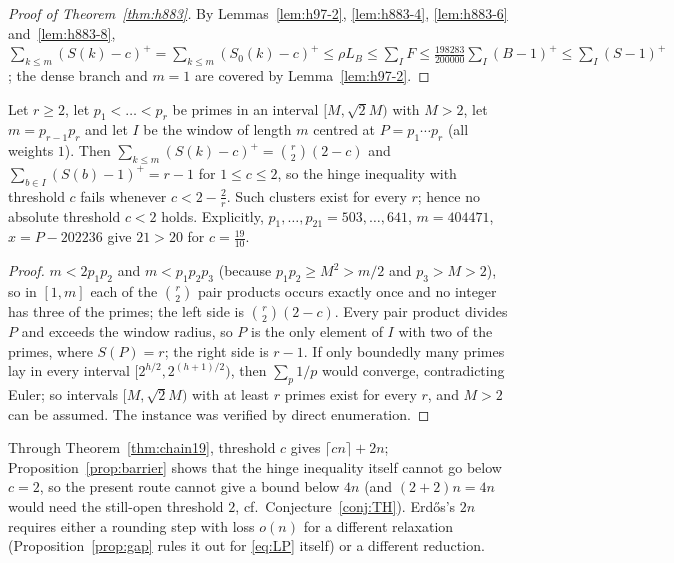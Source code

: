 \begin{proof}[Proof of Theorem~\ref{thm:h883}]
By Lemmas~\ref{lem:h97-2}, \ref{lem:h883-4}, \ref{lem:h883-6} and~\ref{lem:h883-8},
$\sum_{k\le m}(S(k)-c)^+=\sum_{k\le m}(S_0(k)-c)^+\le\rho L_B\le\sum_IF\le\tfrac{198283}{200000}\sum_I(B-1)^+
\le\sum_I(S-1)^+$; the dense branch and $m=1$ are covered by Lemma~\ref{lem:h97-2}.
\end{proof}

\begin{proposition}\label{prop:barrier}
Let $r\ge2$, let $p_1<\dots<p_r$ be primes in an interval $[M,\sqrt2M)$ with $M>2$, let $m=p_{r-1}p_r$ and let $I$ be
the window of length $m$ centred at $P=p_1\cdots p_r$ (all weights $1$). Then
$\sum_{k\le m}(S(k)-c)^+=\binom r2(2-c)$ and $\sum_{b\in I}(S(b)-1)^+=r-1$ for $1\le c\le2$, so the hinge inequality with
threshold $c$ fails whenever $c<2-\tfrac2r$. Such clusters exist for every $r$; hence no absolute threshold $c<2$ holds.
Explicitly, $p_1,\dots,p_{21}=503,\dots,641$, $m=404471$, $x=P-202236$ give $21>20$ for $c=\tfrac{19}{10}$.
\end{proposition}
\begin{proof}
$m<2p_1p_2$ and $m<p_1p_2p_3$ (because $p_1p_2\ge M^2>m/2$ and $p_3>M>2$), so in $[1,m]$ each of the $\binom r2$
pair products occurs exactly once and no integer has three of the primes; the left side is $\binom r2(2-c)$. Every
pair product divides $P$ and exceeds the window radius, so $P$ is the only element of $I$ with two of the primes, where
$S(P)=r$; the right side is $r-1$. If only boundedly many primes lay in every interval $[2^{h/2},2^{(h+1)/2})$, then
$\sum_p1/p$ would converge, contradicting Euler; so intervals $[M,\sqrt2M)$ with at least $r$ primes exist for every
$r$, and $M>2$ can be assumed. The instance was verified by direct enumeration.
\end{proof}

\begin{remark}
Through Theorem~\ref{thm:chain19}, threshold $c$ gives $\lceil cn\rceil+2n$; Proposition~\ref{prop:barrier} shows
that the hinge inequality itself cannot go below $c=2$, so the present route cannot give a bound below $4n$ (and
$(2+2)n=4n$ would need the still-open threshold $2$, cf.\ Conjecture~\ref{conj:TH}). Erd\H{o}s's $2n$ requires
either a rounding step with loss $o(n)$ for a different relaxation (Proposition~\ref{prop:gap} rules it out for
\eqref{eq:LP} itself) or a different reduction.
\end{remark}

